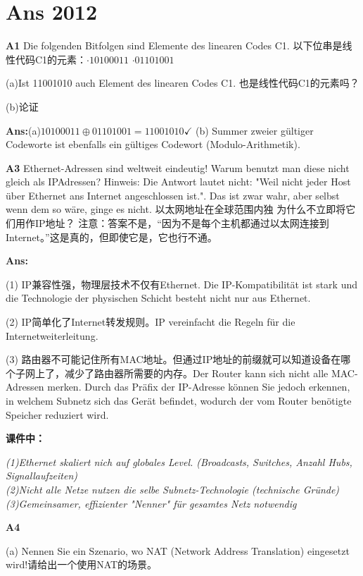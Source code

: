 \documentclass[fleqn]{article}
\begin{document}
\section{Ans 2012}

\noindent\textbf{A1} Die folgenden Bitfolgen sind Elemente des linearen Codes C1. 以下位串是线性代码C1的元素：$\cdot10100011 $ \qquad $\cdot 01101001$

(a)Ist 11001010 auch Element des linearen Codes C1. 也是线性代码C1的元素吗？

(b)论证

\textbf{Ans:}(a)$10100011 \oplus01101001 = 11001010\checkmark$ (b) Summer zweier gültiger Codeworte ist ebenfalls ein gültiges Codewort (Modulo-Arithmetik).

\noindent\textbf{A3} Ethernet-Adressen sind weltweit eindeutig! Warum benutzt man diese nicht gleich als IPAdressen?
Hinweis: Die Antwort lautet nicht: "Weil nicht jeder Host über Ethernet ans Internet angeschlossen ist.". Das ist zwar wahr, aber selbst wenn dem so wäre, ginge es nicht.
以太网地址在全球范围内独 为什么不立即将它们用作IP地址？
注意：答案不是，“因为不是每个主机都通过以太网连接到Internet。”这是真的，但即使它是，它也行不通。

\textbf{Ans:}

(1) IP兼容性强，物理层技术不仅有Ethernet. Die IP-Kompatibilität ist stark und die Technologie der physischen Schicht besteht nicht nur aus Ethernet.

(2) IP简单化了Internet转发规则。IP vereinfacht die Regeln für die Internetweiterleitung.

(3) 路由器不可能记住所有MAC地址。但通过IP地址的前缀就可以知道设备在哪个子网上了，减少了路由器所需要的内存。Der Router kann sich nicht alle MAC-Adressen merken. Durch das Präfix der IP-Adresse können Sie jedoch erkennen, in welchem ​​Subnetz sich das Gerät befindet, wodurch der vom Router benötigte Speicher reduziert wird.

\textbf{课件中：}

\textit{(1)Ethernet skaliert nich auf globales Level. (Broadcasts, Switches, Anzahl Hubs, Signallaufzeiten)\\\indent (2)Nicht alle Netze nutzen die selbe Subnetz-Technologie (technische Gründe)\\\indent (3)Gemeinsamer, effizienter "Nenner" für gesamtes Netz notwendig}

\noindent\textbf{A4} 

(a) Nennen Sie ein Szenario, wo NAT (Network Address Translation) eingesetzt wird!请给出一个使用NAT的场景。
\end{document}
